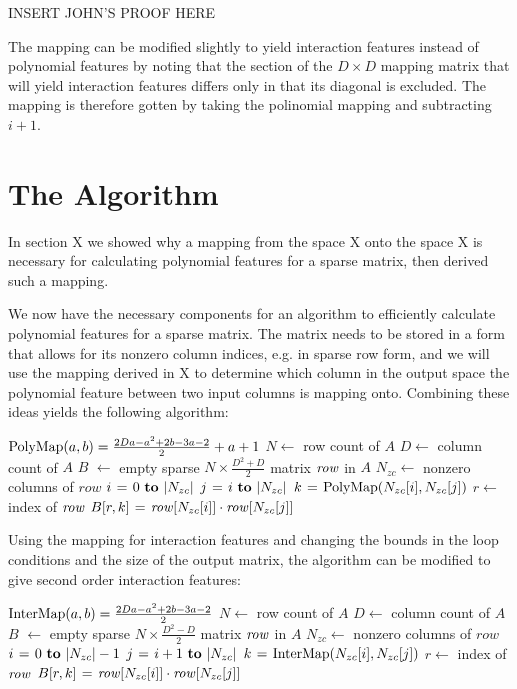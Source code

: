 \documentclass[11pt,twocolumn]{article}
\begin{document}
INSERT JOHN'S PROOF HERE

The mapping can be modified slightly to yield interaction features instead of polynomial features
by noting that the section of the $D \times D$ mapping matrix that will yield interaction
features differs only in that its diagonal is excluded. The mapping is therefore gotten by
taking the polinomial mapping and subtracting $i+1$.


\section{The Algorithm}
In section X we showed why a mapping from the space X
onto the space X is necessary for calculating polynomial features for a sparse matrix, then
derived such a mapping.

We now have the necessary components for an algorithm to efficiently calculate polynomial features for
a sparse matrix. The matrix needs to be stored in a form that allows for its nonzero column indices, e.g. in sparse row form,
and we will use the mapping derived in X to determine which column in the output space
the polynomial feature between two input columns is mapping onto. Combining these ideas yields the following algorithm:

\begin{codebox}
\footnotesize
{}
    \zi $\func{PolyMap}(a, b) = \frac{2Da-a^2+2b-3a-2}{2}+a+1$
    \zi $N \gets$ row count of $A$
    \zi $D \gets$ column count of $A$
    \zi $B$ $\gets$ empty sparse $N \times \frac{D^2+D}{2}$ matrix
    \zi \For $\id{row}$ in $A$ \Do
    \zi     $N_{zc} \gets$ nonzero columns of $row$
    \zi     \For $i \gets 0 \To |N_{zc}|$ \Do
    \zi         \For $j \gets i \To |N_{zc}|$ \Do
    \zi             $k \gets \func{PolyMap}(N_{zc}[i], N_{zc}[j])$
    \zi             $r \gets$ index of $\id{row}$
    \zi             $B[r, k] \gets \id{row}[N_{zc}[i]] \cdot \id{row}[N_{zc}[j]]$
                \End
            \End
       	\End
\end{codebox}

Using the mapping for interaction features and changing the bounds in the loop conditions and the size of the output matrix, 
the algorithm can be modified to give second order interaction features:

\begin{codebox}
\footnotesize
{}
    \zi $\func{InterMap}(a, b) = \frac{2Da-a^2+2b-3a-2}{2}$
    \zi $N \gets$ row count of $A$
    \zi $D \gets$ column count of $A$
    \zi $B$ $\gets$ empty sparse $N \times \frac{D^2-D}{2}$ matrix
    \zi \For $\id{row}$ in $A$ \Do
    \zi     $N_{zc} \gets$ nonzero columns of $row$
    \zi     \For $i \gets 0 \To |N_{zc}|-1$ \Do
    \zi         \For $j \gets i+1 \To |N_{zc}|$ \Do
    \zi             $k \gets \func{InterMap}(N_{zc}[i], N_{zc}[j])$
    \zi             $r \gets$ index of $\id{row}$
    \zi             $B[r, k] \gets \id{row}[N_{zc}[i]] \cdot \id{row}[N_{zc}[j]]$
                \End
            \End
       	\End
\end{codebox}
\end{document}

